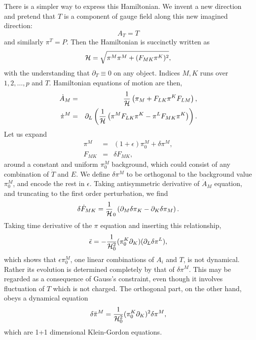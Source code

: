 \documentclass[a4paper,12pt]{article}
\newcommand{\p}{\partial}
\begin{document}
There is a simpler way to express this Hamiltonian. We invent a new
direction and pretend that $T$ is a component of gauge field along 
this new imagined direction:
\begin{equation}
A_T=T
\end{equation}
and similarly $\pi^T=P$. Then the Hamiltonian is succinctly written as
\begin{equation}
{\cal H}=\sqrt{ \pi^M\pi^M +(F_{MK}\pi^K)^2 } ,
\end{equation}
with the understanding that $\p_T\equiv 0$ on any object. Indices $M,K$
runs over $1,2, \dots, p$ and $ T$.
Hamiltonian equations of motion are then,
\begin{eqnarray}
\dot A_M &=&\frac{1}{\cal H} \left( \pi_M + F_{LK}\pi^K F_{LM} \right), 
\nonumber \\
\dot \pi^M &=& \p_L \left(\frac{1}{\cal H} \left(\pi^MF_{LK}\pi^K -
 \pi^L F_{MK}\pi^K \right)\right) .
\end{eqnarray}
Let us expand 
\begin{eqnarray}
\pi^M&=& (1+\epsilon)\pi^M_0+\delta\pi^M ,\nonumber \\
F_{MK}&=&\delta F_{MK} ,
\end{eqnarray}
around a constant and uniform $\pi_0^M$ background, which could consist
of any combination of $\dot T $ and $E$. We define $\delta \pi^M$ to be 
orthogonal to the background value $\pi_0^M$, and encode the rest
in $\epsilon$.
Taking antisymmetric derivative of $\dot A_M$ equation, and truncating
to the first order perturbation, we find
\begin{equation}
\delta \dot F_{MK}=\frac{1}{\cal H}_0
\left(\p_M\delta \pi_K-\p_K\delta \pi_M\right).
\end{equation}
Taking time derivative of the $\pi$ equation and inserting this
relationship, 
\begin{equation}
\ddot \epsilon = -\frac{1}{{\cal H}_0^2}
(\pi^K_0 \p_K)(\p_L \delta \pi^L),
\end{equation}
which shows that $\epsilon\pi_0^M$, one linear combinations of $A_i$ and
$T$,  is not dynamical. Rather its evolution is determined completely by
that of  $\delta \pi^M$.  This may be regarded as a consequence of
Gauss's constraint, even though it involves fluctuation of $T$ which is
not charged. The orthogonal part, on the other hand, obeys a dynamical
equation 
\begin{equation}
\delta \ddot \pi^M= \frac{1}{{\cal H}_0^2}(\pi^K_0 \p_K)^2\delta \pi^M ,
\end{equation}
which are 1+1 dimensional Klein-Gordon equations.
\end{document}
